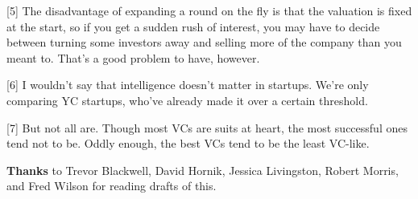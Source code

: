 {[}5{]} The disadvantage of expanding a round on the fly is that the
valuation is fixed at the start, so if you get a sudden rush of
interest, you may have to decide between turning some investors away and
selling more of the company than you meant to. That's a good problem to
have, however.

{[}6{]} I wouldn't say that intelligence doesn't matter in startups.
We're only comparing YC startups, who've already made it over a certain
threshold.

{[}7{]} But not all are. Though most VCs are suits at heart, the most
successful ones tend not to be. Oddly enough, the best VCs tend to be
the least VC-like.

\textbf{Thanks} to Trevor Blackwell, David Hornik, Jessica Livingston,
Robert Morris, and Fred Wilson for reading drafts of this.
